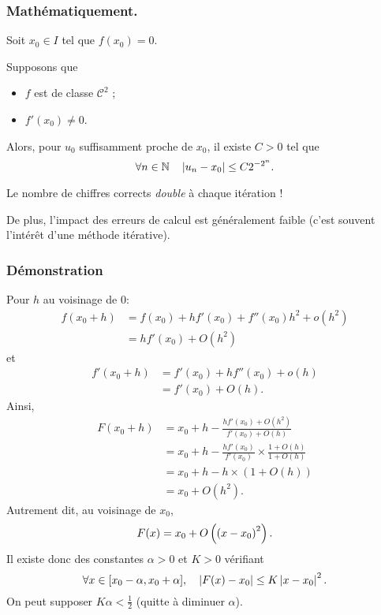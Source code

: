 \subsubsection{Mathématiquement.}

Soit $x_{0}\in I$ tel que $f(x_{0}) = 0$.

Supposons que 
\begin{itemize}
\item $f$ est de classe $\mathcal{C}^{2}$ ;
\item $f'(x_{0})\neq 0$.
\end{itemize}

Alors, pour $u_{0}$ suffisamment proche
de $x_{0}$, il existe $C>0$ tel que
\begin{equation*}
  \forall n\in\mathbb{N}\quad \left|u_{n} - x_{0}\right| \leq C 2^{-2^{n}}.
\end{equation*}

Le nombre de chiffres corrects \emph{double} à chaque itération !

De plus, l'impact des erreurs de calcul est généralement faible (c'est souvent l'intérêt d'une
méthode itérative).
\subsubsection{Démonstration}

Pour $h$ au voisinage de $0$:
\begin{align*}
 f(x_{0}+h) &= f(x_{0}) + hf'(x_{0}) + f''(x_{0})h^{2} + o(h^{2})\\
 &= hf'(x_{0}) + O(h^{2})
\end{align*}
et 
\begin{align*}
 f'(x_{0}+h)&= f'(x_{0}) + hf''(x_{0}) + o(h)\\
 &= f'(x_{0}) + O(h).
\end{align*}
Ainsi,
\begin{align*}
F(x_{0}+h) &= x_{0} + h - \frac{hf'(x_{0})+O(h^{2})}{f'(x_{0})+O(h)}\\
&= x_{0} + h - \frac{hf'(x_{0})}{f'(x_{0})}\times\frac{1+O(h)}{1+O(h)}\\
&= x_{0} + h - h\times(1+O(h))\\
&= x_{0} + O(h^{2}).
\end{align*}
Autrement dit, au voisinage de $x_0$,
\begin{equation*}
  F(x) = x_{0} + O\left(\left(x-x_{0}\right)^{2}\right).
\end{equation*}
Il existe donc des constantes $\alpha>0$ et $K>0$ vérifiant
\begin{equation*}
  \forall x\in [x_{0}-\alpha, x_{0}+\alpha],
  \quad \left|F(x) - x_{0}\right|\leq K\left|x-x_{0}\right|^{2}.
\end{equation*}
On peut supposer $K\alpha<\frac{1}{2}$ (quitte à diminuer $\alpha$).

